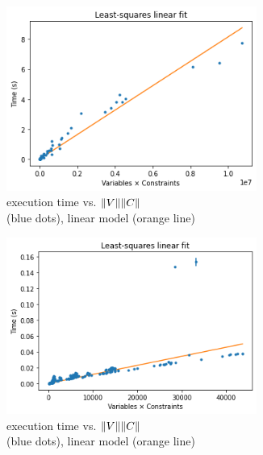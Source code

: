 \begin{figure}
\begin{subfigure}{0.475\textwidth}
\includegraphics[width=0.9\textwidth]{images/least-squares-solve.png}
\caption{\solve execution time vs. $\lVert V\rVert\lVert C\rVert$ \\ (blue dots), linear model (orange line)}
\label{fig:stats:linregress-solve}
\end{subfigure}
\hfill
\begin{subfigure}{0.475\textwidth}
\includegraphics[width=0.9\textwidth]{images/least-squares-RecCheck.png}
\caption{\RecCheck execution time vs. $\lVert V\rVert\lVert C\rVert$ \\ (blue dots), linear model (orange line)}
\label{fig:stats:linregress-reccheck}
\end{subfigure}
\\[3ex]
\begin{subfigure}{0.475\textwidth}

\end{subfigure}
\end{figure}

